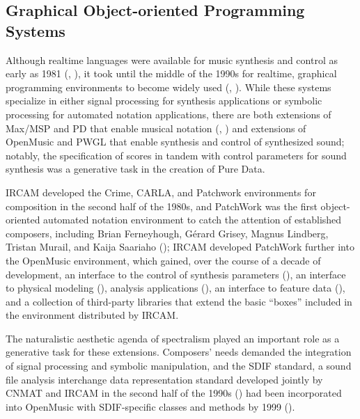 \subsection{Graphical Object-oriented Programming Systems}
Although realtime languages were available for music synthesis and control as early as 1981 (\cite{Mathews:1981lo}, \cite{mathews1983rtsked}), it took until the middle of the 1990s for realtime, graphical programming environments to become widely used (\cite{Puckette:1991hs}, \cite{Puckette:1996kc}). While these systems specialize in either signal processing for synthesis applications or symbolic processing for automated notation applications, there are both extensions of Max/MSP and PD that enable musical notation (\cite{didkovsky2008maxscore}, \cite{Kelly:2011rw}) and extensions of OpenMusic and PWGL that enable synthesis and control of synthesized sound; notably, the specification of scores in tandem with control parameters for sound synthesis was a generative task in the creation of Pure Data.

IRCAM developed the Crime, CARLA, and Patchwork environments for composition in the second half of the 1980s, and PatchWork was the first object-oriented automated notation environment to catch the attention of established composers, including Brian Ferneyhough, G\'{e}rard Grisey, Magnus Lindberg, Tristan Murail, and Kaija Saariaho (\cite{Assayag:1999sw}); IRCAM developed PatchWork further into the OpenMusic environment, which gained, over the course of a decade of development, an interface to the control of synthesis parameters (\cite{agon2000high}), an interface to physical modeling (\cite{polfreman2002modalys}), analysis applications (\cite{buteau2009melodic}), an interface to feature data (\cite{bresson2010processing}), and a collection of third-party libraries that extend the basic ``boxes'' included in the environment distributed by IRCAM. 

The naturalistic aesthetic agenda of spectralism played an important role as a generative task for these extensions. Composers' needs demanded the integration of signal processing and symbolic manipulation, and the SDIF standard, a sound file analysis interchange data representation standard developed jointly by CNMAT and IRCAM in the second half of the 1990s (\cite{wright1999audio}) had been incorporated into OpenMusic with SDIF-specific classes and methods by 1999 (\cite{schwarz2000extensions}). 

